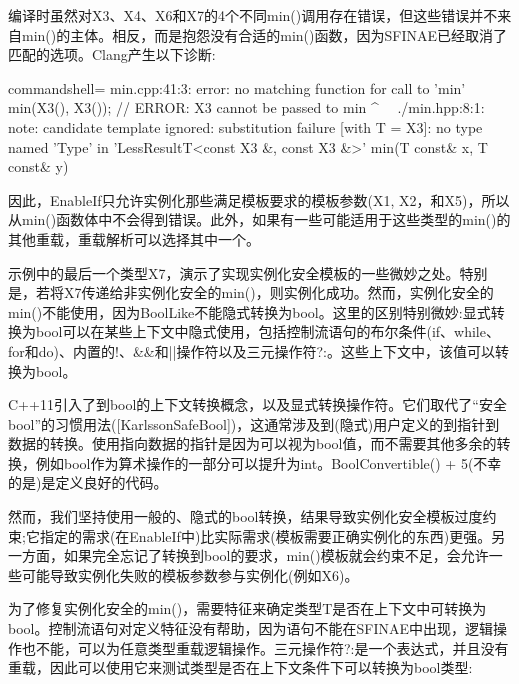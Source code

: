 编译时虽然对X3、X4、X6和X7的4个不同min()调用存在错误，但这些错误并不来自min()的主体。相反，而是抱怨没有合适的min()函数，因为SFINAE已经取消了匹配的选项。Clang产生以下诊断:

\begin{tcblisting}{commandshell={}}
min.cpp:41:3: error: no matching function for call to ’min’
min(X3(), X3()); // ERROR: X3 cannot be passed to min
^~~
./min.hpp:8:1: note: candidate template ignored: substitution failure
[with T = X3]: no type named ’Type’ in
’LessResultT<const X3 &, const X3 &>’
min(T const& x, T const& y)
\end{tcblisting}

因此，EnableIf只允许实例化那些满足模板要求的模板参数(X1, X2，和X5)，所以从min()函数体中不会得到错误。此外，如果有一些可能适用于这些类型的min()的其他重载，重载解析可以选择其中一个。

示例中的最后一个类型X7，演示了实现实例化安全模板的一些微妙之处。特别是，若将X7传递给非实例化安全的min()，则实例化成功。然而，实例化安全的min()不能使用，因为BoolLike不能隐式转换为bool。这里的区别特别微妙:显式转换为bool可以在某些上下文中隐式使用，包括控制流语句的布尔条件(if、while、for和do)、内置的!、\&\&和||操作符以及三元操作符?:。这些上下文中，该值可以转换为bool。

\begin{tcolorbox}[colback=webgreen!5!white,colframe=webgreen!75!black]
\hspace*{0.75cm}C++11引入了到bool的上下文转换概念，以及显式转换操作符。它们取代了“安全bool”的习惯用法([KarlssonSafeBool])，这通常涉及到(隐式)用户定义的到指针到数据的转换。使用指向数据的指针是因为可以视为bool值，而不需要其他多余的转换，例如bool作为算术操作的一部分可以提升为int。BoolConvertible() + 5(不幸的是)是定义良好的代码。
\end{tcolorbox}

然而，我们坚持使用一般的、隐式的bool转换，结果导致实例化安全模板过度约束;它指定的需求(在EnableIf中)比实际需求(模板需要正确实例化的东西)更强。另一方面，如果完全忘记了转换到bool的要求，min()模板就会约束不足，会允许一些可能导致实例化失败的模板参数参与实例化(例如X6)。

为了修复实例化安全的min()，需要特征来确定类型T是否在上下文中可转换为bool。控制流语句对定义特征没有帮助，因为语句不能在SFINAE中出现，逻辑操作也不能，可以为任意类型重载逻辑操作。三元操作符?:是一个表达式，并且没有重载，因此可以使用它来测试类型是否在上下文条件下可以转换为bool类型:


